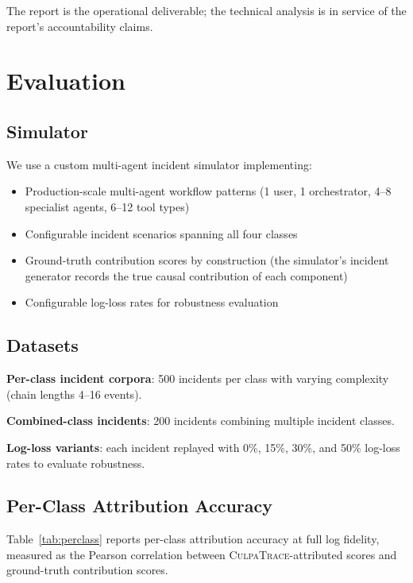 \documentclass[sigconf,nonacm]{acmart}
\begin{document}
The report is the operational deliverable; the technical analysis
is in service of the report's accountability claims.

\section{Evaluation}

\subsection{Simulator}

We use a custom multi-agent incident simulator implementing:

\begin{itemize}
  \item Production-scale multi-agent workflow patterns (1 user, 1
        orchestrator, 4--8 specialist agents, 6--12 tool types)
  \item Configurable incident scenarios spanning all four classes
  \item Ground-truth contribution scores by construction (the
        simulator's incident generator records the true causal
        contribution of each component)
  \item Configurable log-loss rates for robustness evaluation
\end{itemize}

\subsection{Datasets}

\textbf{Per-class incident corpora}: 500 incidents per class with
varying complexity (chain lengths 4--16 events).

\textbf{Combined-class incidents}: 200 incidents combining
multiple incident classes.

\textbf{Log-loss variants}: each incident replayed with 0\%, 15\%,
30\%, and 50\% log-loss rates to evaluate robustness.

\subsection{Per-Class Attribution Accuracy}

Table~\ref{tab:perclass} reports per-class attribution accuracy at
full log fidelity, measured as the Pearson correlation between
\textsc{CulpaTrace}-attributed scores and ground-truth contribution
scores.
\end{document}
